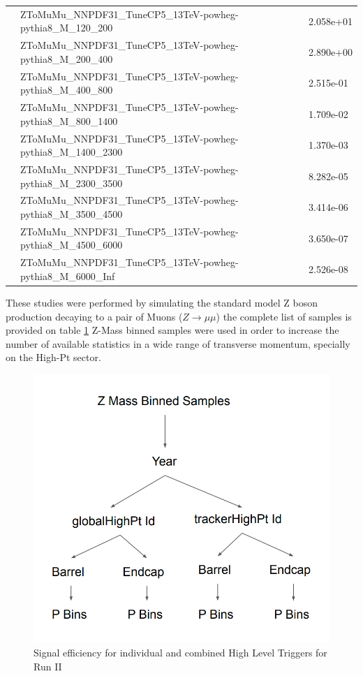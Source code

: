 \begin{table}
\begin{center}
\begin{tabular}{|l|l|l|}
&ZToMuMu\_NNPDF31\_TuneCP5\_13TeV-powheg-pythia8\_M\_120\_200 & 2.058e+01\\
&ZToMuMu\_NNPDF31\_TuneCP5\_13TeV-powheg-pythia8\_M\_200\_400 & 2.890e+00\\
&ZToMuMu\_NNPDF31\_TuneCP5\_13TeV-powheg-pythia8\_M\_400\_800 & 2.515e-01\\
&ZToMuMu\_NNPDF31\_TuneCP5\_13TeV-powheg-pythia8\_M\_800\_1400 & 1.709e-02\\
&ZToMuMu\_NNPDF31\_TuneCP5\_13TeV-powheg-pythia8\_M\_1400\_2300 & 1.370e-03\\
&ZToMuMu\_NNPDF31\_TuneCP5\_13TeV-powheg-pythia8\_M\_2300\_3500 & 8.282e-05\\
&ZToMuMu\_NNPDF31\_TuneCP5\_13TeV-powheg-pythia8\_M\_3500\_4500 & 3.414e-06\\
&ZToMuMu\_NNPDF31\_TuneCP5\_13TeV-powheg-pythia8\_M\_4500\_6000 & 3.650e-07\\
&ZToMuMu\_NNPDF31\_TuneCP5\_13TeV-powheg-pythia8\_M\_6000\_Inf & 2.526e-08\\
\hline
\end{tabular}
\label{tab:MomentumResolutionSamples}
\end{center}
\end{table}

These studies were performed by simulating the standard model Z boson production
decaying to a pair of Muons ($Z\rightarrow\mu\mu$) the complete list of samples is
provided on table \ref{tab:MomentumResolutionSamples}
Z-Mass binned samples were used in order to increase the number of available
statistics in a wide range of transverse momentum, specially on the High-Pt sector.

\begin{figure}[tph]
  \centering
  \includegraphics[width=.5\textwidth]{fig/MomentumResolution/MomentumResolutionBins.png}
  \caption{Signal efficiency for individual and combined High Level Triggers for Run II}
  \label{fig:MomentumResolutionBins}
\end{figure}

